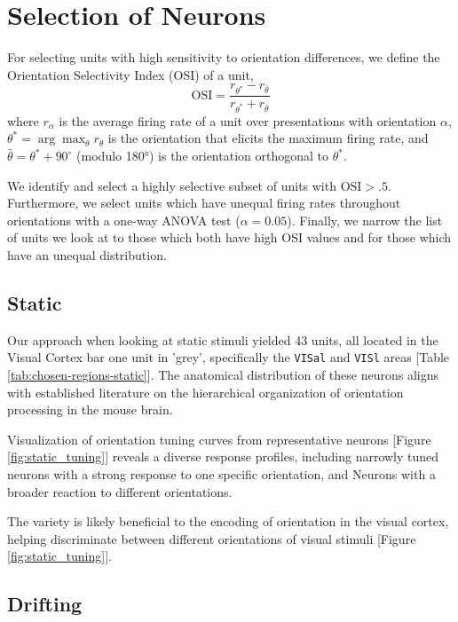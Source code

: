 \documentclass[10pt,twocolumn]{article}
\begin{document}
\section{Selection of Neurons}

For selecting units with high sensitivity to orientation differences, we define the Orientation Selectivity Index (OSI) of a unit,
\[\textrm{OSI} = \frac{r_{\theta^*} - r_{\bar\theta}}{r_{\theta^*} + r_{\bar\theta}}\]
where $r_\alpha$ is the average firing rate of a unit over presentations with orientation $\alpha$, $\theta^* = \arg\max_\theta r_\theta$ is the orientation that elicits the maximum firing rate, and $\bar{\theta} = \theta^* + 90^\circ$ (modulo 180°) is the orientation orthogonal to $\theta^*$.

We identify and select a highly selective subset of units with \(\textrm{OSI} > .5\).  Furthermore, we select units which have unequal firing rates throughout orientations with a one-way ANOVA test (\(\alpha = 0.05\)).  Finally, we narrow the list of units we look at to those which both have high OSI values and for those which have an unequal distribution.

\subsection{Static}

Our approach when looking at static stimuli yielded 43 units, all located in the Visual Cortex bar one unit in 'grey', specifically the \texttt{VISal} and \texttt{VISl} areas [Table \ref{tab:chosen-regions-static}].  The anatomical distribution of these neurons aligns with established literature on the hierarchical organization of orientation processing in the mouse brain.

Visualization of orientation tuning curves from representative neurons [Figure \ref{fig:static_tuning}] reveals a diverse response profiles, including narrowly tuned neurons with a strong response to one specific orientation, and Neurons with a broader reaction to different orientations.

The variety is likely beneficial to the encoding of orientation in the visual cortex, helping discriminate between different orientations of visual stimuli [Figure \ref{fig:static_tuning}].

\subsection{Drifting}
\end{document}
